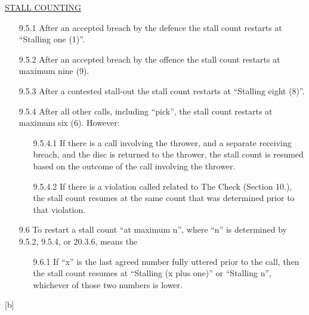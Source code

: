 \underline{\uppercase{stall counting}}
\begin{itemize}[noitemsep]
    \tiny
    \item[9.5.1] After an accepted breach by the defence the stall count restarts at “Stalling one (1)”.
    \item[9.5.2] After an accepted breach by the offence the stall count restarts at maximum nine (9).
    \item[9.5.3] After a contested stall-out the stall count restarts at “Stalling eight (8)”.
    \item[9.5.4] After all other calls, including “pick”, the stall count restarts at maximum six (6). However:
        \begin{itemize}
            \item[9.5.4.1] If there is a call involving the thrower, and a separate receiving breach, and the disc is returned to the thrower, the stall count is resumed based on the outcome of the call involving the thrower.
            \item[9.5.4.2] If there is a violation called related to The Check (Section 10.), the stall count resumes at the same count that was determined prior to that violation.
        \end{itemize}
    \item[9.6] To restart a stall count “at maximum n”, where “n” is determined by 9.5.2, 9.5.4, or 20.3.6, means the
        \begin{itemize}
            \item[9.6.1] If “x” is the last agreed number fully uttered prior to the call, then the stall count resumes at “Stalling (x plus one)” or “Stalling n”, whichever of those two numbers is lower.
        \end{itemize}

\end{itemize}
\begin{center}[b]\end{center}
